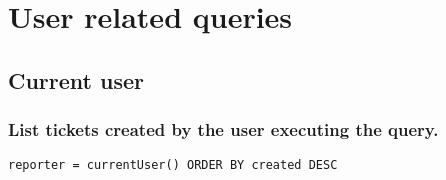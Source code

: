 \newpage
\section{User related queries}

\subsection{Current user}

\subsubsection*{List tickets created by the user executing the query.}

\begin{small}
    \begin{lstlisting}[language=jql]
    reporter = currentUser() ORDER BY created DESC
\end{lstlisting}
\end{small}